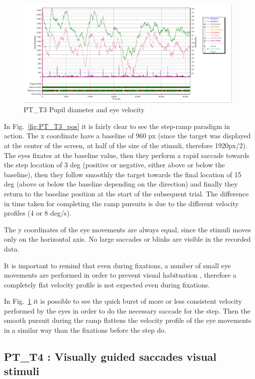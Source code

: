 \begin{figure}[t]
  \centering
  \includegraphics[width=.8\textwidth]{figures/graphs/PT_T3(stepRamp)_VP.png}
  \caption[PT\_T3 Pupil size and velocity profile]{PT\_T3 Pupil diameter and eye velocity}
  \label{fig:PT_T3_vel}
\end{figure}

In Fig.~\ref{fig:PT_T3_pos} it is fairly clear to see the step-ramp paradigm in action. The x coordinate have a baseline of 960 px (since the target was displayed at the center of the screen, at half of the size of the stimuli, therefore 1920px/2). The eyes fixates at the baseline value, then they perform a rapid saccade towards the step location of 3 deg (positive or negative, either above or below the baseline), then they follow smoothly the target towards the final location of 15 deg (above or below the baseline depending on the direction) and finally they return to the baseline position at the start of the subsequent trial. The difference in time taken for completing the ramp pursuits is due to the different velocity profiles (4 or 8 deg/s).

The y coordinates of the eye movements are always equal, since the stimuli moves only on the horizontal axis. No large saccades or blinks are visible in the recorded data.

It is important to remind that even during fixations, a number of small eye movements are performed in order to prevent visual habituation \citep[p. 3]{leigh2015neurology}, therefore a completely flat velocity profile is not expected even during fixations.

In Fig.~\ref{fig:PT_T3_vel} it is possible to see the quick burst of more or less consistent velocity performed by the eyes in order to do the necessary saccade for the step. Then the smooth pursuit during the ramp flattens the velocity profile of the eye movements in a similar way than the fixations before the step do.


\subsection{PT\_T4 : Visually guided saccades visual stimuli}
\label{sec:PT_T4}

